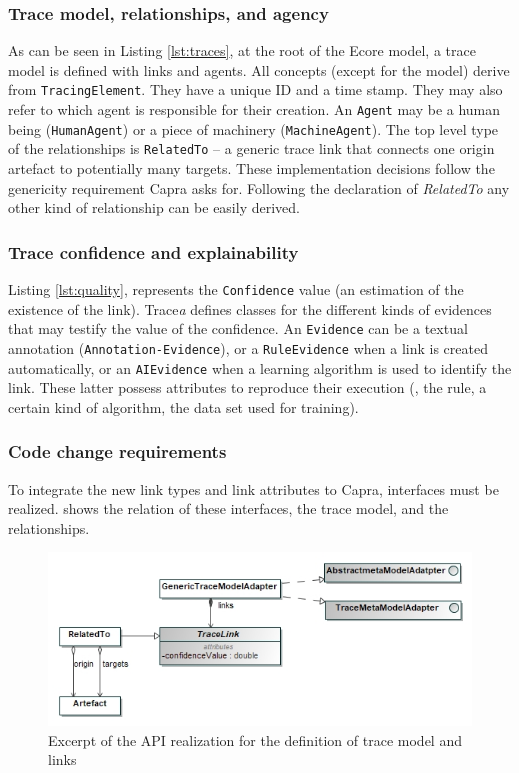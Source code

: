 \subsubsection{Trace model, relationships, and agency}
As can be seen in Listing \ref{lst:traces}, at the root of the Ecore model, a trace model is defined with links and agents. All concepts (except for the model) derive from \texttt{TracingElement}. They have a unique ID and a time stamp. They may also refer to which agent is responsible for their creation. An \texttt{Agent} may be a human being (\texttt{HumanAgent}) or a piece of machinery (\texttt{MachineAgent}).
The top level type of the relationships is \texttt{RelatedTo} -- a generic trace link that connects one origin artefact to potentially many targets. 
These implementation decisions follow the genericity requirement Capra asks for. Following the declaration of \textit{RelatedTo} any other kind of relationship can be easily derived.
\pagebreak


\subsubsection{Trace confidence and explainability}
Listing \ref{lst:quality}, represents the \texttt{Confidence} value (\ie an estimation of the existence of the link). Trace\textit{a} defines classes for the different kinds of evidences that may testify the value of the confidence. An \texttt{Evidence} can be a textual annotation (\texttt{Annotation-Evidence}), or a \texttt{RuleEvidence} when a link is created automatically, or an \texttt{AIEvidence} when a learning algorithm is used to identify the link. These latter possess attributes to reproduce their execution (\textit{\eg}, the rule, a certain kind of algorithm, the data set used for training).



\subsubsection{Code change requirements}
To integrate the new link types and link attributes to Capra, interfaces must be realized.  shows the relation of these interfaces, the trace model, and the relationships. 
\begin{figure}[h]  
	\centering
	\includegraphics[width=.8\linewidth]{images/interfaces-realization.jpg}
	\caption{Excerpt of the API realization for the definition of trace model and links}
	\label{fig:interfaces-realization} 
\end{figure} 

